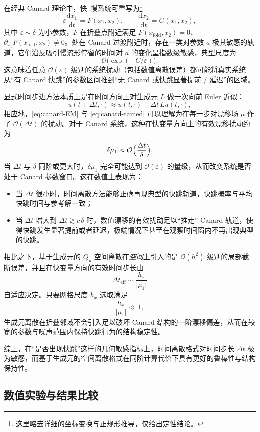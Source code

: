 在经典 Canard 理论中，快--慢系统可重写为\footnote{这里略去详细的坐标变换与正规形推导，仅给出定性结论。}
\[
\varepsilon\frac{\mathrm{d}x_1}{\mathrm{d}t}
= F(x_1,x_2),\qquad
\frac{\mathrm{d}x_2}{\mathrm{d}t} = G(x_1,x_2),
\]
其中 \(\varepsilon\sim\delta\) 为小参数，\(F\) 在折叠点附近满足 \(F(x_{\mathrm{fold}},x_2)=0\)、\(\partial_{x_1}F(x_{\mathrm{fold}},x_2)\ne0\)。处在 Canard 过渡附近时，存在一类对参数 \(a\) 极其敏感的轨道，它们沿反吸引慢流形停留的时间对 \(a\) 的变化呈指数级敏感，典型尺度为
\[
\mathcal O\bigl(\exp(-C/\varepsilon)\bigr).
\]
这意味着任意 \(\mathcal O(\varepsilon)\) 级别的系统扰动（包括数值离散误差）都可能将真实系统从“有 Canard 快跳”的参数区间推到“无 Canard 或快跳显著提前 / 延迟”的区域。

显式时间步进方法本质上是在时间方向上对生成元 \(L\) 做一次向前 Euler 近似：
\[
u(t+\Delta t,\cdot)\approx u(t,\cdot) + \Delta t\,Lu(t,\cdot),
\]
相应地，\eqref{eq:canard-EM} 与 \eqref{eq:canard-tamed} 可以理解为在每一步对漂移场 \(\mu\) 作了 \(\mathcal O(\Delta t)\) 的扰动。对于 Canard 系统，这种在快变量方向上的有效漂移扰动约为
\[
\delta\mu_1 \approx \mathcal O\Bigl(\frac{\Delta t}{\delta}\Bigr),
\]
当 \(\Delta t\) 与 \(\delta\) 同阶或更大时，\(\delta\mu_1\) 完全可能达到 \(\mathcal O(\varepsilon)\) 的量级，从而改变系统是否处于 Canard 参数窗口。这在数值上表现为：

\begin{itemize}
	\item 当 \(\Delta t\) 很小时，时间离散方法能够正确再现典型的快跳轨道，快跳概率与平均快跳时间与参考解一致；
	\item 当 \(\Delta t\) 增大到 \(\Delta t\gtrsim c\,\delta\) 时，数值漂移的有效扰动足以“推走” Canard 轨道，使得快跳发生显著提前或者延迟，极端情况下甚至在观察时间窗内不再出现典型的快跳。
\end{itemize}

相比之下，基于生成元的 \(Q_u\) 空间离散在\emph{空间}上引入的是 \(\mathcal O(h^2)\) 级别的局部截断误差，并且在快变量方向的有效时间步长由
\[
\Delta t_{\mathrm{eff}}\sim \frac{h_x}{\lvert\mu_1\rvert}
\]
自适应决定。只要网格尺度 \(h_x\) 选取满足
\[
\frac{h_x}{\lvert\mu_1\rvert} \ll 1,
\]
生成元离散在折叠邻域不会引入足以破坏 Canard 结构的一阶漂移偏差，从而在较宽的参数与噪声范围内保持快跳行为的结构稳定性。

综上，在“是否出现快跳”这样的几何敏感指标上，时间离散格式对时间步长 \(\Delta t\) 极为敏感，而基于生成元的空间离散格式在同阶计算代价下具有更好的鲁棒性与结构保持性。

\subsection{数值实验与结果比较}

